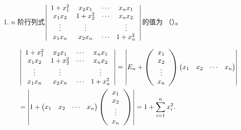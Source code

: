 \begin{enumerate}[1~]
\begin{enumerate}[1.~]
\item
$n$ 阶行列式$\left| \begin{array} { c c c c } { 1 + x _ { 1 } ^ { 2 } } & { x _ { 2 } x _ { 1 } } & { \cdots } & { x _ { n } x _ { 1 } } \\ { x _ { 1 } x _ { 2 } } & { 1 + x _ { 2 } ^ { 2 } } & { \cdots } & { x _ { n } x _ { 2 } } \\ { \vdots } & { \vdots } & { } & { \vdots } \\ { x _ { 1 } x _ { n } } & { x _ { 2 } x _ { n } } & { \cdots } & { 1 + x _ { n } ^ { 2 } } \end{array} \right|$的值为 （\quad）。
\begin{solution}
\begin{align*}
&\left| \begin{array} { c c c c } { 1 + x _ { 1 } ^ { 2 } } & { x _ { 2 } x _ { 1 } } & { \cdots } & { x _ { n } x _ { 1 } } \\ { x _ { 1 } x _ { 2 } } & { 1 + x _ { 2 } ^ { 2 } } & { \cdots } & { x _ { n } x _ { 2 } } \\ { \vdots } & { \vdots } & { } & { \vdots } \\ { x _ { 1 } x _ { n } } & { x _ { 2 } x _ { n } } & { \cdots } & { 1 + x _ { n } ^ { 2 } } \end{array} \right|
=\left|E_n+\left( \begin{array}{c}
	x_1\\
	x_2\\
	\vdots\\
	x_n\\
\end{array} \right) \left( \begin{matrix}
	x_1&		x_2&		\cdots&		x_n\\
\end{matrix} \right) \right|\\
&=\left|1+\left( \begin{matrix}
	x_1&		x_2&		\cdots&		x_n\\
\end{matrix} \right) \left( \begin{array}{c}
	x_1\\
	x_2\\
	\vdots\\
	x_n\\
\end{array} \right) \right|=1+\sum_{i=1}^n x_i^2.
\end{align*}
\end{solution}


\end{enumerate}
\end{enumerate}
